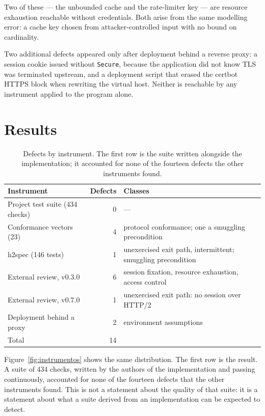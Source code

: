 \documentclass[preprint,12pt]{elsarticle}
\begin{document}
Two of these --- the unbounded cache and the rate-limiter key --- are resource
exhaustion reachable without credentials. Both arise from the same modelling
error: a cache key chosen from attacker-controlled input with no bound on
cardinality.

Two additional defects appeared only after deployment behind a reverse proxy: a
session cookie issued without \texttt{Secure}, because the application did not
know TLS was terminated upstream, and a deployment script that erased the
certbot HTTPS block when rewriting the virtual host. Neither is reachable by any
instrument applied to the program alone.

\section{Results}
\label{sec:results}

\begin{table}[ht]
\centering
\caption{Defects by instrument. The first row is the suite written alongside the
         implementation; it accounted for none of the fourteen defects the other
         instruments found.}
\label{tab:results}
\begin{tabular}{lrl}
\toprule
Instrument & Defects & Classes \\
\midrule
Project test suite (434 checks) & 0  & --- \\
Conformance vectors (23)        & 4  & protocol conformance; one a smuggling precondition \\
h2spec (146 tests)              & 1  & unexercised exit path, intermittent; smuggling precondition \\
External review, v0.3.0         & 6  & session fixation, resource exhaustion, access control \\
External review, v0.7.0         & 1  & unexercised exit path: no session over HTTP/2 \\
Deployment behind a proxy       & 2  & environment assumptions \\
\midrule
Total                           & 14 & \\
\bottomrule
\end{tabular}
\end{table}

Figure~\ref{fig:instrumentos} shows the same distribution. The first row is
the result. A suite of 434 checks, written by the authors of
the implementation and passing continuously, accounted for none of the fourteen
defects that the other instruments found. This is not a statement about
the quality of that suite: it is a statement about what a suite derived from an
implementation can be expected to detect.
\end{document}
